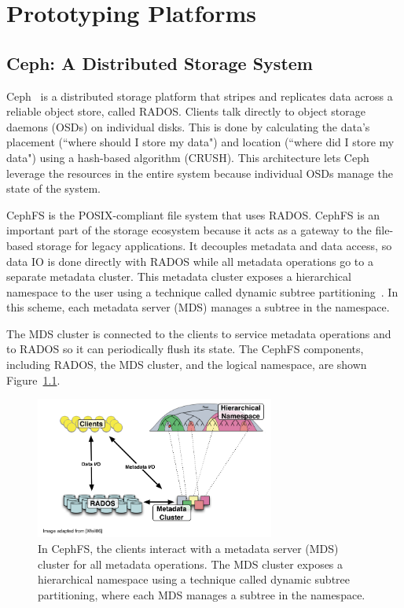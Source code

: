 \chapter{Prototyping Platforms}
\label{chp:prototyping-platform}

\section{Ceph: A Distributed Storage System}
Ceph~\cite{weil:osdi2006-ceph} is a distributed storage platform that stripes
and replicates data across a reliable object store, called RADOS. Clients talk
directly to object storage daemons (OSDs) on individual disks. This is done by
calculating the data's placement (``where should I store my data") and location
(``where did I store my data") using a hash-based algorithm (CRUSH). This
architecture lets Ceph leverage the resources in the entire system because
individual OSDs manage the state of the system. 

CephFS is the POSIX-compliant file system that uses RADOS. CephFS is an
important part of the storage ecosystem because it acts as a gateway to the
file-based storage for legacy applications. It decouples metadata and data
access, so data IO is done directly with RADOS while all metadata operations go
to a separate metadata cluster. This metadata cluster exposes a hierarchical
namespace to the user using a technique called dynamic subtree
partitioning~\cite{weil:sc2004-dyn-metadata}. In this scheme, each metadata
server (MDS) manages a subtree in the namespace. 

The MDS cluster is connected to the clients to service metadata operations and
to RADOS so it can periodically flush its state. The CephFS components,
including RADOS, the MDS cluster, and the logical namespace, are shown
Figure~\ref{ceph-arch}. 

\begin{figure}[t]
\centering
	\includegraphics[width=0.7\textwidth]{./chapters/advancement/figures/ceph-arch.png} 

	\caption{In CephFS, the clients interact with a metadata server (MDS)
        cluster for all metadata operations. The MDS cluster exposes a hierarchical
        namespace using a technique called dynamic subtree partitioning, where each MDS
        manages a subtree in the namespace.\label{ceph-arch}}

\end{figure}

